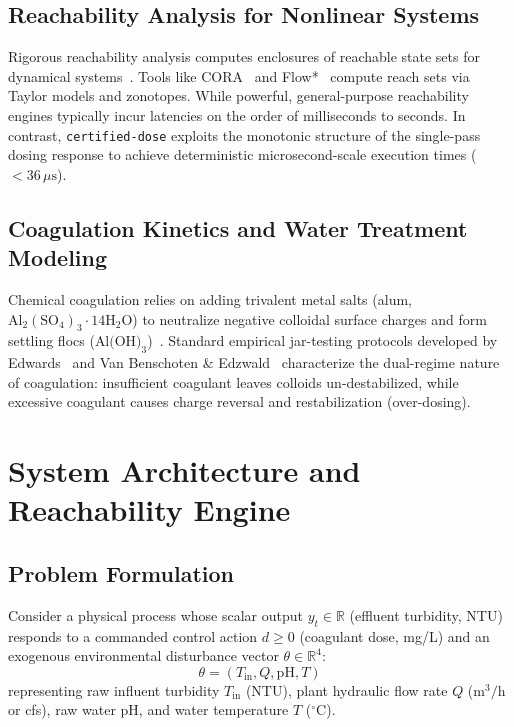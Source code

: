 \documentclass[10pt,twocolumn,letterpaper]{article}
\theoremstyle{definition}
\newcommand{\R}{\mathbb{R}}
\newcommand{\Tin}{T_{\text{in}}}
\begin{document}
\subsection{Reachability Analysis for Nonlinear Systems}
Rigorous reachability analysis computes enclosures of reachable state sets for dynamical systems~\cite{moore1966interval,althoff2015introduction,chen2013flowstar}. Tools like CORA~\cite{althoff2015introduction} and Flow*~\cite{chen2013flowstar} compute reach sets via Taylor models and zonotopes. While powerful, general-purpose reachability engines typically incur latencies on the order of milliseconds to seconds. In contrast, \texttt{certified-dose} exploits the monotonic structure of the single-pass dosing response to achieve deterministic microsecond-scale execution times ($<36\,\mu\text{s}$).

\subsection{Coagulation Kinetics and Water Treatment Modeling}
Chemical coagulation relies on adding trivalent metal salts (alum, $\text{Al}_2(\text{SO}_4)_3\cdot 14\text{H}_2\text{O}$) to neutralize negative colloidal surface charges and form settling flocs ($\text{Al(OH)}_3$)~\cite{stumm1996aquatic,dentel1988coagulation,crittenden2012mwh}. Standard empirical jar-testing protocols developed by Edwards~\cite{edwards1997predicting} and Van Benschoten \& Edzwald~\cite{vanbenschoten1990chemical} characterize the dual-regime nature of coagulation: insufficient coagulant leaves colloids un-destabilized, while excessive coagulant causes charge reversal and restabilization (over-dosing).

\section{System Architecture and Reachability Engine}

\subsection{Problem Formulation}
Consider a physical process whose scalar output $y_t \in \R$ (effluent turbidity, NTU) responds to a commanded control action $d \ge 0$ (coagulant dose, mg/L) and an exogenous environmental disturbance vector $\theta \in \R^4$:
\begin{equation}
\theta = (\Tin, Q, \text{pH}, T)
\end{equation}
representing raw influent turbidity $\Tin$ (NTU), plant hydraulic flow rate $Q$ ($\text{m}^3/\text{h}$ or cfs), raw water pH, and water temperature $T$ ($^\circ\text{C}$).
\end{document}
